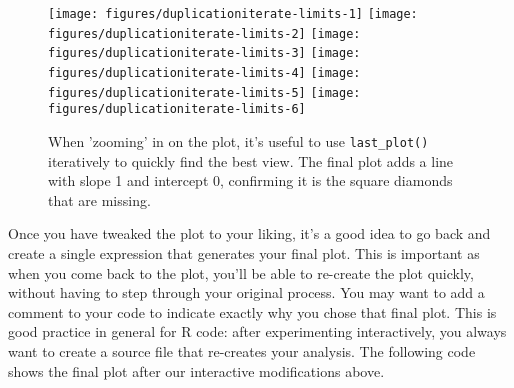 \begin{Shaded}
\begin{Highlighting}[]
  \NormalTok{)}
\NormalTok{() +}\StringTok{ }\NormalTok{(}\NormalTok{, }\NormalTok{) +}\StringTok{ }\NormalTok{(}\NormalTok{, }\NormalTok{)}
\NormalTok{() +}\StringTok{ }\NormalTok{(}\NormalTok{, }\NormalTok{) +}\StringTok{ }\NormalTok{(}\NormalTok{, }\NormalTok{)}
\NormalTok{() +}\StringTok{ }\NormalTok{(}\NormalTok{, }\NormalTok{) +}\StringTok{ }\NormalTok{(}\NormalTok{, }\NormalTok{)}
\NormalTok{() +}\StringTok{ }\NormalTok{(}\NormalTok{, }\NormalTok{) +}\StringTok{ }\NormalTok{(}\NormalTok{, }\NormalTok{)}
\NormalTok{() +}\StringTok{ }\NormalTok{(} \NormalTok{)}
\end{Highlighting}
\end{Shaded}

\begin{figure}

{\centering \texttt{[image: figures/duplicationiterate-limits-1]} \texttt{[image: figures/duplicationiterate-limits-2]} \texttt{[image: figures/duplicationiterate-limits-3]} \texttt{[image: figures/duplicationiterate-limits-4]} \texttt{[image: figures/duplicationiterate-limits-5]} \texttt{[image: figures/duplicationiterate-limits-6]} 

}

\caption{When 'zooming' in on the plot, it's useful to use \texttt{last\_plot()} iteratively to quickly find the best view. The final plot adds a line with slope 1 and intercept 0, confirming it is the square diamonds that are missing.\label{fig:iterate-limits}}
\end{figure}

Once you have tweaked the plot to your liking, it's a good idea to go
back and create a single expression that generates your final plot. This
is important as when you come back to the plot, you'll be able to
re-create the plot quickly, without having to step through your original
process. You may want to add a comment to your code to indicate exactly
why you chose that final plot. This is good practice in general for R
code: after experimenting interactively, you always want to create a
source file that re-creates your analysis. The following code shows the
final plot after our interactive modifications above.

